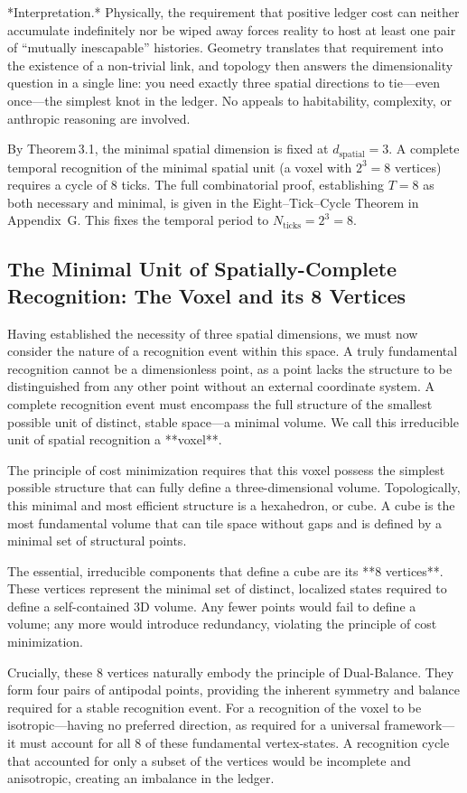 *Interpretation.*  Physically, the requirement that positive ledger cost can neither accumulate indefinitely nor be wiped away forces reality to host at least one pair of “mutually inescapable” histories.  Geometry translates that requirement into the existence of a non‑trivial link, and topology then answers the dimensionality question in a single line: you need exactly three spatial directions to tie—even once—the simplest knot in the ledger.  No appeals to habitability, complexity, or anthropic reasoning are involved.

By Theorem 3.1, the minimal spatial dimension is fixed at \(d_{\text{spatial}}=3\). A complete temporal recognition of the minimal spatial unit (a voxel with $2^3=8$ vertices) requires a cycle of 8 ticks. The full combinatorial proof, establishing $T=8$ as both necessary and minimal, is given in the Eight–Tick–Cycle Theorem in Appendix~G. This fixes the temporal period to \(N_{\text{ticks}}=2^{3}=8\).

\subsection{The Minimal Unit of Spatially-Complete Recognition: The Voxel and its 8 Vertices}
Having established the necessity of three spatial dimensions, we must now consider the nature of a recognition event within this space. A truly fundamental recognition cannot be a dimensionless point, as a point lacks the structure to be distinguished from any other point without an external coordinate system. A complete recognition event must encompass the full structure of the smallest possible unit of distinct, stable space—a minimal volume. We call this irreducible unit of spatial recognition a **voxel**.

The principle of cost minimization requires that this voxel possess the simplest possible structure that can fully define a three-dimensional volume. Topologically, this minimal and most efficient structure is a hexahedron, or cube. A cube is the most fundamental volume that can tile space without gaps and is defined by a minimal set of structural points.

The essential, irreducible components that define a cube are its **8 vertices**. These vertices represent the minimal set of distinct, localized states required to define a self-contained 3D volume. Any fewer points would fail to define a volume; any more would introduce redundancy, violating the principle of cost minimization.

Crucially, these 8 vertices naturally embody the principle of Dual-Balance. They form four pairs of antipodal points, providing the inherent symmetry and balance required for a stable recognition event. For a recognition of the voxel to be isotropic—having no preferred direction, as required for a universal framework—it must account for all 8 of these fundamental vertex-states. A recognition cycle that accounted for only a subset of the vertices would be incomplete and anisotropic, creating an imbalance in the ledger.

